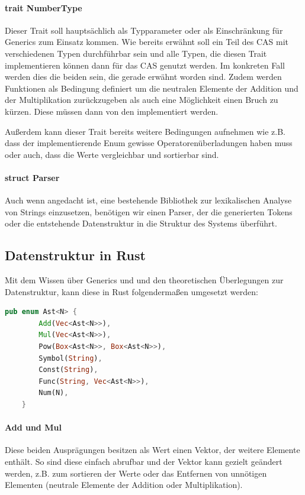 \documentclass[11pt,a4paper, ngerman]{article}
\begin{document}
\paragraph{trait NumberType} Dieser Trait soll hauptsächlich als Typparameter oder als Einschränkung für Generics zum Einsatz kommen. Wie bereits erwähnt soll ein Teil des CAS mit verschiedenen Typen durchführbar sein und alle Typen, die diesen Trait implementieren können dann für das CAS genutzt werden. Im konkreten Fall werden dies die beiden  sein, die gerade erwähnt worden sind. Zudem werden Funktionen als Bedingung definiert um die neutralen Elemente der Addition und der Multiplikation zurückzugeben als auch eine Möglichkeit einen Bruch zu kürzen. Diese müssen dann von den  implementiert werden.

Außerdem kann dieser Trait bereits weitere Bedingungen aufnehmen wie z.B. dass der implementierende Enum gewisse Operatorenüberladungen haben muss oder auch, dass die Werte vergleichbar und sortierbar sind.

\paragraph{struct Parser} Auch wenn angedacht ist, eine bestehende Bibliothek zur lexikalischen Analyse von Strings einzusetzen, benötigen wir einen Parser, der die generierten Tokens oder die entstehende Datenstruktur in die Struktur des Systems überführt.

\subsection{Datenstruktur in Rust}
Mit dem Wissen über Generics und und den theoretischen Überlegungen zur Datenstruktur, kann diese in Rust folgendermaßen umgesetzt werden:
\begin{lstlisting}[language=rust, caption={Datenstruktur in Rust}]
    pub enum Ast<N> {
        Add(Vec<Ast<N>>),
        Mul(Vec<Ast<N>>),
        Pow(Box<Ast<N>>, Box<Ast<N>>),
        Symbol(String),
        Const(String),
        Func(String, Vec<Ast<N>>),
        Num(N),
    }
\end{lstlisting}

\paragraph{Add und Mul} Diese beiden Ausprägungen besitzen als Wert einen Vektor, der weitere Elemente enthält. So sind diese einfach abrufbar und der Vektor kann gezielt geändert werden, z.B. zum sortieren der Werte oder das Entfernen von unnötigen Elementen (neutrale Elemente der Addition oder Multiplikation).
\end{document}

